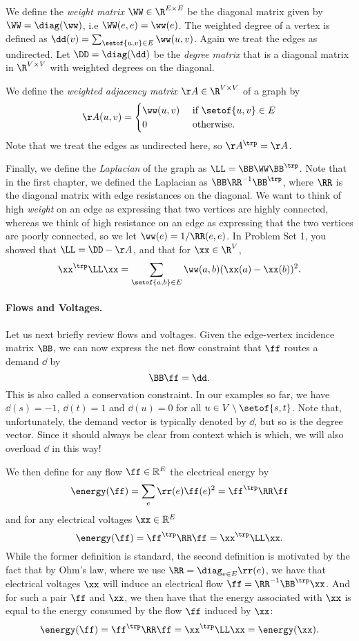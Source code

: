 We define the \emph{weight matrix} $\WW \in \R^{E \times E}$ be the diagonal matrix given by $\WW =
\diag(\ww)$, i.e $\WW(e,e) = \ww(e)$. The weighted degree of a vertex is defined as $\dd(v) = \sum_{\setof{u,v}
  \in E} \ww(u,v)$. Again we treat the edges as undirected.
Let $\DD = \diag(\dd)$ be the \emph{degree matrix} that is a diagonal matrix in $\R^{V \times V}$
with weighted degrees on the diagonal.

We define the \emph{weighted adjacency matrix} $\AA \in \R^{V \times V}$ of a graph by
\[
  \AA(u,v) =
  \begin{cases}
    \ww(u,v) & \text{ if } \setof{u,v} \in E \\
    0  & \text{ otherwise. }
  \end{cases}
\]
Note that we treat the edges as undirected here, so $\AA^{\trp} = \AA$.

Finally, we define the \emph{Laplacian} of the graph as $\LL = \BB\WW\BB^{\trp}$. Note that in the first chapter, we defined the Laplacian as
$\BB\RR^{-1}\BB^{\trp}$,
where $\RR$ is the diagonal matrix with edge resistances on the
diagonal.
We want to think of high \emph{weight} on an edge as expressing that two
vertices are highly connected, whereas we think of high resistance on
an edge as expressing that the two vertices are poorly connected, so
we let $\ww(e) = 1/\RR(e,e)$.
In Problem Set 1, you showed that $\LL = \DD - \AA$, and that for $\xx
\in \R^V$,
\[
\xx^{\trp} \LL \xx = \sum_{\setof{a,b} \in E} \ww(a,b) (\xx(a) - \xx(b))^2.
  \]

\paragraph{Flows and Voltages.} Let us next briefly review flows and voltages. Given the edge-vertex incidence matrix $\BB$, we can now express the net flow constraint that $\ff$ routes a demand $\dd$ by
\[
  \BB \ff = \dd.
\]
This is also called a conservation constraint. In our examples so far, we have $\dd(s) = -1$, $\dd(t) = 1$ and $\dd(u) = 0$ for all $u\in V\setminus\setof{s,t}$. Note that, unfortunately, the demand vector is typically denoted by $\dd$, but so is the degree vector. Since it should always be clear from context which is which, we will also overload $\dd$ in this way!

We then define for any flow $\ff \in \mathbb{R}^E$ the electrical energy by
\[
  \energy(\ff) = \sum_e \rr(e) \ff(e)^2 = \ff^{\trp} \RR \ff
\]
and for any electrical voltages $\xx \in \mathbb{R}^E$
\[
 \energy(\ff) = \ff^{\trp} \RR \ff = \xx^{\trp} \LL \xx.
\]
While the former definition is standard, the second definition is motivated by the fact that by Ohm's law, where we use $\RR = \diag_{e \in E} \rr(e)$, we have that electrical voltages $\xx$ will induce an
electrical flow $\ff = \RR^{-1}\BB^{\trp} \xx$. And for such a pair $\ff$ and $\xx$, we then have that the energy associated with $\xx$ is equal to the energy consumed by the flow $\ff$ induced by $\xx$:
\[
 \energy(\ff) = \ff^{\trp} \RR \ff = \xx^{\trp} \LL \xx = \energy(\xx).
\]

